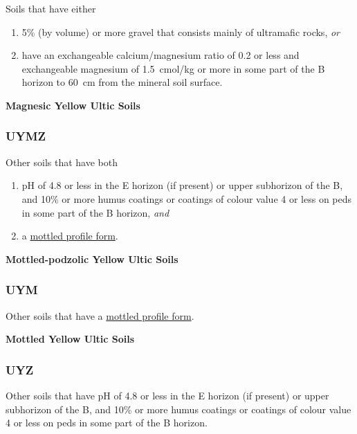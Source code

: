 \documentclass[
  letterpaper,
  DIV=11,
  numbers=noendperiod]{scrreprt}
\providecommand{\tightlist}{%
  \setlength{\itemsep}{0pt}\setlength{\parskip}{0pt}}\usepackage{longtable,booktabs,array}
\begin{document}
Soils that have either

\begin{enumerate}
\def\labelenumi{\arabic{enumi}.}
\tightlist
\item
  5\% (by volume) or more gravel that consists mainly of ultramafic
  rocks, \emph{or}
\item
  have an exchangeable calcium/magnesium ratio of 0.2 or less and
  exchangeable magnesium of 1.5~cmol/kg or more in some part of the B
  horizon to 60~cm from the mineral soil surface.
\end{enumerate}

\textbf{Magnesic Yellow Ultic Soils}

\hypertarget{sec-key-UYMZ}{%
\subsubsection{\texorpdfstring{\textbf{UYMZ}}{UYMZ}}\label{sec-key-UYMZ}}

Other soils that have both

\begin{enumerate}
\def\labelenumi{\arabic{enumi}.}
\tightlist
\item
  pH of 4.8 or less in the E horizon (if present) or upper subhorizon of
  the B, and 10\% or more humus coatings or coatings of colour value 4
  or less on peds in some part of the B horizon, \emph{and}
\item
  a \protect\hyperlink{sec-diag-mottpf}{mottled profile form}.
\end{enumerate}

\textbf{Mottled-podzolic Yellow Ultic Soils}

\hypertarget{sec-key-UYM}{%
\subsubsection{\texorpdfstring{\textbf{UYM}}{UYM}}\label{sec-key-UYM}}

Other soils that have a \protect\hyperlink{sec-diag-mottpf}{mottled
profile form}.

\textbf{Mottled Yellow Ultic Soils}

\hypertarget{sec-key-UYZ}{%
\subsubsection{\texorpdfstring{\textbf{UYZ}}{UYZ}}\label{sec-key-UYZ}}

Other soils that have pH of 4.8 or less in the E horizon (if present) or
upper subhorizon of the B, and 10\% or more humus coatings or coatings
of colour value 4 or less on peds in some part of the B horizon.
\end{document}
